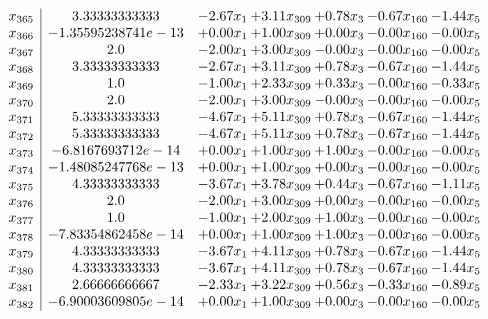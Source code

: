\documentclass[8pt]{article}
\begin{document}
\[\begin{array}{c| c c@{\hskip 2pt} c@{\hskip 2pt} c@{\hskip 2pt} c@{\hskip 2pt} c@{\hskip 2pt} }
 x_{365}   &  3.33333333333 & -2.67 x_{1} & +  3.11 x_{309} & +  0.78 x_{3} & -0.67 x_{160} & -1.44 x_{5}\\
 x_{366}   &  -1.35595238741e-13 & +  0.00 x_{1} & +  1.00 x_{309} & +  0.00 x_{3} & -0.00 x_{160} & -0.00 x_{5}\\
 x_{367}   &  2.0 & -2.00 x_{1} & +  3.00 x_{309} & -0.00 x_{3} & -0.00 x_{160} & -0.00 x_{5}\\
 x_{368}   &  3.33333333333 & -2.67 x_{1} & +  3.11 x_{309} & +  0.78 x_{3} & -0.67 x_{160} & -1.44 x_{5}\\
 x_{369}   &  1.0 & -1.00 x_{1} & +  2.33 x_{309} & +  0.33 x_{3} & -0.00 x_{160} & -0.33 x_{5}\\
 x_{370}   &  2.0 & -2.00 x_{1} & +  3.00 x_{309} & -0.00 x_{3} & -0.00 x_{160} & -0.00 x_{5}\\
 x_{371}   &  5.33333333333 & -4.67 x_{1} & +  5.11 x_{309} & +  0.78 x_{3} & -0.67 x_{160} & -1.44 x_{5}\\
 x_{372}   &  5.33333333333 & -4.67 x_{1} & +  5.11 x_{309} & +  0.78 x_{3} & -0.67 x_{160} & -1.44 x_{5}\\
 x_{373}   &  -6.8167693712e-14 & +  0.00 x_{1} & +  1.00 x_{309} & +  1.00 x_{3} & -0.00 x_{160} & -0.00 x_{5}\\
 x_{374}   &  -1.48085247768e-13 & +  0.00 x_{1} & +  1.00 x_{309} & +  0.00 x_{3} & -0.00 x_{160} & -0.00 x_{5}\\
 x_{375}   &  4.33333333333 & -3.67 x_{1} & +  3.78 x_{309} & +  0.44 x_{3} & -0.67 x_{160} & -1.11 x_{5}\\
 x_{376}   &  2.0 & -2.00 x_{1} & +  3.00 x_{309} & +  0.00 x_{3} & -0.00 x_{160} & -0.00 x_{5}\\
 x_{377}   &  1.0 & -1.00 x_{1} & +  2.00 x_{309} & +  1.00 x_{3} & -0.00 x_{160} & -0.00 x_{5}\\
 x_{378}   &  -7.83354862458e-14 & +  0.00 x_{1} & +  1.00 x_{309} & +  1.00 x_{3} & -0.00 x_{160} & -0.00 x_{5}\\
 x_{379}   &  4.33333333333 & -3.67 x_{1} & +  4.11 x_{309} & +  0.78 x_{3} & -0.67 x_{160} & -1.44 x_{5}\\
 x_{380}   &  4.33333333333 & -3.67 x_{1} & +  4.11 x_{309} & +  0.78 x_{3} & -0.67 x_{160} & -1.44 x_{5}\\
 x_{381}   &  2.66666666667 & -2.33 x_{1} & +  3.22 x_{309} & +  0.56 x_{3} & -0.33 x_{160} & -0.89 x_{5}\\
 x_{382}   &  -6.90003609805e-14 & +  0.00 x_{1} & +  1.00 x_{309} & +  0.00 x_{3} & -0.00 x_{160} & -0.00 x_{5}\\

\end{array}\]
\end{document}
